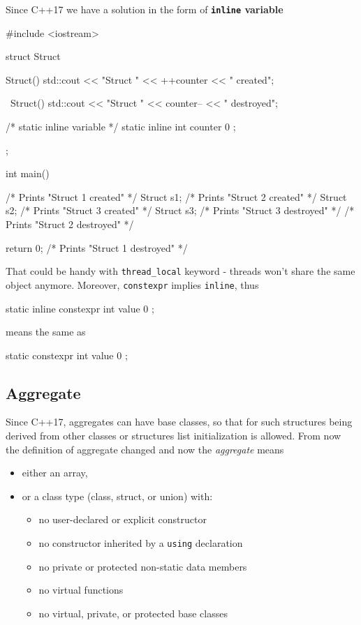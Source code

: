 \documentclass[../main]{subfiles}
\begin{document}
    Since C++17 we have a solution in the form of
\textbf{\texttt{inline} variable}
\begin{Code}
    #include <iostream>
    
    struct Struct
    {
        Struct()
        {
            std::cout << "Struct " << ++counter << " created\n";
        }
        
        ~Struct()
        {
            std::cout << "Struct " << counter-- << " destroyed\n";
        }

        /* static inline variable */
        static inline int counter { 0 };
    };
    
    int main()
    {
        /* Prints "Struct 1 created" */
        Struct s1;
        {
            /* Prints "Struct 2 created" */
            Struct s2;
            {
                /* Prints "Struct 3 created" */
                Struct s3;
            }
            /* Prints "Struct 3 destroyed" */
        }
        /* Prints "Struct 2 destroyed" */
        
        return 0;
        /* Prints "Struct 1 destroyed" */
    }
\end{Code}
That could be handy with \texttt{thread\_local} keyword - threads won't share the same object anymore. Moreover, \texttt{constexpr}
implies \texttt{inline}, thus
\begin{Code}
    static inline constexpr int value { 0 };
\end{Code}
means the same as
\begin{Code}
    static constexpr int value { 0 };
\end{Code}

\subsection{Aggregate}
    Since C++17, aggregates can have base classes, so that for such structures being derived from other
classes or structures list initialization is allowed. From now the definition of aggregate changed and now the \textit{aggregate} means
\begin{itemize}
    \item either an array,
    \item or a class type (class, struct, or union) with:
    \begin{itemize}
        \item no user-declared or explicit constructor
        \item no constructor inherited by a \texttt{using} declaration
        \item no private or protected non-static data members
        \item no virtual functions
        \item no virtual, private, or protected base classes
    \end{itemize}
\end{itemize}
\end{document}
